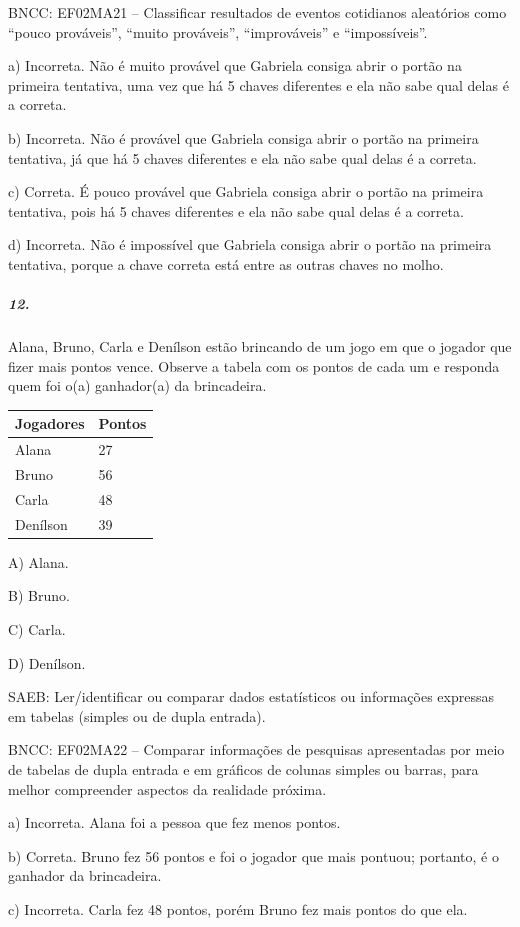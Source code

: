 BNCC: EF02MA21 -- Classificar resultados de eventos cotidianos aleatórios
como ``pouco prováveis'', ``muito prováveis'', ``improváveis'' e ``impossíveis''.

a) Incorreta. Não é muito provável que Gabriela consiga abrir o portão
na primeira tentativa, uma vez que há 5 chaves diferentes e ela não sabe
qual delas é a correta.

b) Incorreta. Não é provável que Gabriela consiga abrir o portão na
primeira tentativa, já que há 5 chaves diferentes e ela não sabe qual
delas é a correta.

c) Correta. É pouco provável que Gabriela consiga abrir o portão na
primeira tentativa, pois há 5 chaves diferentes e ela não sabe qual
delas é a correta.

d) Incorreta. Não é impossível que Gabriela consiga abrir o portão na
primeira tentativa, porque a chave correta está entre as outras chaves
no molho.

\subparagraph{12. }\label{section-111}

Alana, Bruno, Carla e Denílson estão brincando de um jogo em que o
jogador que fizer mais pontos vence. Observe a tabela com os pontos de
cada um e responda quem foi o(a) ganhador(a) da brincadeira.

\begin{longtable}[]{@{}ll@{}}
\toprule
Jogadores & Pontos\tabularnewline
\midrule
\endhead
Alana & 27\tabularnewline
Bruno & 56\tabularnewline
Carla & 48\tabularnewline
Denílson & 39\tabularnewline
\bottomrule
\end{longtable}

A) Alana.

B) Bruno.

C) Carla.

D) Denílson.

SAEB: Ler/identificar ou comparar dados estatísticos ou
informações expressas em tabelas (simples ou de dupla entrada).

BNCC: EF02MA22 -- Comparar informações de pesquisas apresentadas por meio
de tabelas de dupla entrada e em gráficos de colunas simples ou barras,
para melhor compreender aspectos da realidade próxima.

a) Incorreta. Alana foi a pessoa que fez menos pontos.

b) Correta. Bruno fez 56 pontos e foi o jogador que mais pontuou;
portanto, é o ganhador da brincadeira.

c) Incorreta. Carla fez 48 pontos, porém Bruno fez mais pontos do que ela.

